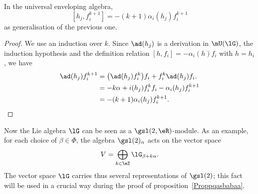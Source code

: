 \begin{proposition}
	In the universal enveloping algebra,
	\begin{equation}        \label{Eqhjfikplusun}
		[h_j,f_i^{k+1}]=-(k+1)\alpha_i(h_j)f_i^{k+1}
	\end{equation}
	as generalisation of the previous one.
\end{proposition}

\begin{proof}
	We use an induction over $k$. Since $\ad(h_j)$ is a derivation in $\mU(\lG)$, the induction hypothesis and the definition relation $[h,f_i]=-\alpha_i(h)f_i$ with $h=h_i$, we have
	\begin{equation}
		\begin{split}
			\ad(h_j)f^{k+1}_i   &=\big( \ad(h_j)f_i^k \big)f_i+f_i^k\ad(h_j)f_i.\\
			&=-k\alpha+i(h_j)f_i^kf_i-\alpha_i(h_j)f^{k+1}_i\\
			&=-(k+1)\alpha_i(h_j)f_i^{k+1}.
		\end{split}
	\end{equation}
\end{proof}

Now the Lie algebra \( \lG\) can be seen as a \( \gsl(2,\eR)\)-module. As an example, for each choice of \( \beta\in\Phi\), the algebra \( \gsl(2)_{\alpha}\) acts on the vector space
\begin{equation}
	V=\bigoplus_{k\in\eZ}\lG_{\beta+k\alpha}.
\end{equation}
The vector space \( \lG\) carries thus several representations of \( \gsl(2)\); this fact will be used in a crucial way during the proof of proposition~\ref{Proppqasbabaa}.
